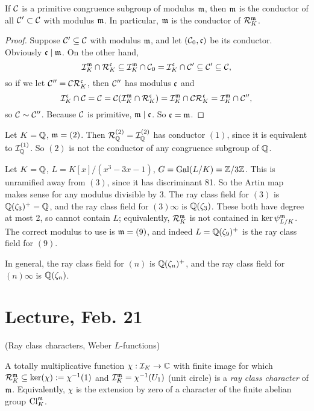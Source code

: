 \documentclass[11pt]{amsart}
\begin{document}
\begin{prop}
    If $\mathcal{C}$ is a primitive congruence subgroup of modulus $\mathfrak{m}$, then $\mathfrak{m}$ is the conductor of all $\mathcal{C}'\subset \mathcal{C}$ with modulus $\mathfrak{m}$. In particular, $\mathfrak{m}$ is the conductor of $\mathcal{R}_K^{\mathfrak{m}}$.
\end{prop}

\begin{proof}
    Suppose $\mathcal{C}'\subseteq \mathcal{C}$ with modulus $\mathfrak{m}$, and let $(\mathcal{C}_0,\mathfrak{c})$ be its conductor. Obviously $\mathfrak{c}\mid\mathfrak{m}$. On the other hand, 
    \[\mathcal{I}_K^{\mathfrak{m}}\cap \mathcal{R}_K^{\mathfrak{c}} \subseteq \mathcal{I}_K^{\mathfrak{m}}\cap \mathcal{C}_0 = \mathcal{I}_K^{\mathfrak{c}} \cap \mathcal{C}' \subseteq \mathcal{C}'\subseteq \mathcal{C},\]
    so if we let $\mathcal{C}'' = \mathcal{C}\mathcal{R}_K^{\mathfrak{c}}$, then $\mathcal{C}''$ has modulus $\mathfrak{c}$ and 
    \[\mathcal{I}_K^{\mathfrak{c}}\cap \mathcal{C} = \mathcal{C} = \mathcal{C}(\mathcal{I}_K^{\mathfrak{m}}\cap \mathcal{R}_K^{\mathfrak{c}}) = \mathcal{I}_K^{\mathfrak{m}} \cap \mathcal{C}\mathcal{R}_K^{\mathfrak{c}} = \mathcal{I}_K^{\mathfrak{m}}\cap \mathcal{C}'',\]
    so $\mathcal{C}\sim\mathcal{C}''$. Because $\mathcal{C}$ is primitive, $\mathfrak{m}\mid \mathfrak{c}$. So $\mathfrak{c}=\mathfrak{m}$.
\end{proof}


\begin{exm}
    Let $K= \mathbb{Q}$, $\mathfrak{m} = (2)$. Then $\mathcal{R}_{\mathbb{Q}}^{(2)} = \mathcal{I}_{\mathbb{Q}}^{(2)}$ has conductor $(1)$, since it is equivalent to $\mathcal{I}_{\mathbb{Q}}^{(1)}$. So $(2)$ is not the conductor of any congruence subgroup of $\mathbb{Q}$.
\end{exm}

\begin{exm}
    Let $K = \mathbb{Q}$, $L = K[x]/(x^3-3x-1)$, $G =\operatorname{Gal}(L/K) = \mathbb{Z}/3\mathbb{Z}$. This is unramified away from $(3)$, since it has discriminant 81. So the Artin map makes sense for any modulus divisible by 3. The ray class field for $(3)$ is $\mathbb{Q}(\zeta_3)^+ = \mathbb{Q}$, and the ray class field for $(3)\infty$ is $\mathbb{Q}(\zeta_3)$. These both have degree at most 2, so cannot contain $L$; equivalently, $\mathcal{R}_K^{\mathfrak{m}}$ is not contained in $\ker\psi_{L/K}^{\mathfrak{m}}$. The correct modulus to use is $\mathfrak{m} = (9)$, and indeed $L = \mathbb{Q}(\zeta_9)^+$ is the ray class field for $(9)$.
    
    In general, the ray class field for $(n)$ is $\mathbb{Q}(\zeta_n)^+$, and the ray class field for $(n)\infty$ is $\mathbb{Q}(\zeta_n)$.
\end{exm}


\section{Lecture, Feb. 21}

(Ray class characters, Weber $L$-functions)

\begin{defn}
    A totally multiplicative function $\chi: \mathcal{I}_K\to \mathbb{C}$ with finite image for which $\mathcal{R}_K^{\mathfrak{m}} \subseteq \ker(\chi) := \chi^{-1}(1)$ and $\mathcal{I}_K^{\mathfrak{m}} = \chi^{-1}(U_1)$ (unit circle) is a \emph{ray class character} of $\mathfrak{m}$. Equivalently, $\chi$ is the extension by zero of a character of the finite abelian group $\operatorname{Cl}_K^{\mathfrak{m}}$.
\end{defn}
\end{document}
